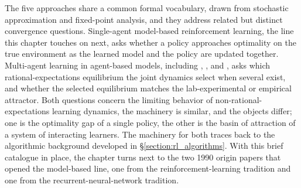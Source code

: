 \label{section:fc_convergence_question}%
The five approaches share a common formal vocabulary, drawn from stochastic approximation and fixed-point analysis, and they address related but distinct convergence questions. Single-agent model-based reinforcement learning, the line this chapter touches on next, asks whether a policy approaches optimality on the true environment as the learned model and the policy are updated together. Multi-agent learning in agent-based models, including \citet{MarimonMcGrattanSargent1990}, \citet{KrusellSmith1998}, and \citet{Calvano2020}, asks which rational-expectations equilibrium the joint dynamics select when several exist, and whether the selected equilibrium matches the lab-experimental or empirical attractor. Both questions concern the limiting behavior of non-rational-expectations learning dynamics, the machinery is similar, and the objects differ; one is the optimality gap of a single policy, the other is the basin of attraction of a system of interacting learners. The machinery for both traces back to the algorithmic background developed in \S\ref{section:rl_algorithms}. With this brief catalogue in place, the chapter turns next to the two 1990 origin papers that opened the model-based line, one from the reinforcement-learning tradition and one from the recurrent-neural-network tradition.
